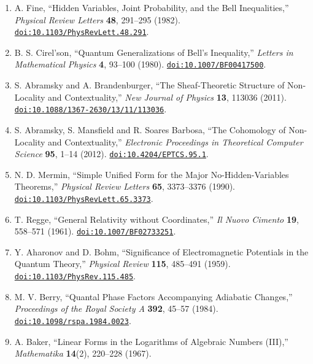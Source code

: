 \documentclass[
  11pt,
]{article}
\begin{document}
\begin{enumerate}
{  Review Letters} \textbf{23}, 880--884 (1969).
  \href{https://doi.org/10.1103/PhysRevLett.23.880}{\nolinkurl{doi:10.1103/PhysRevLett.23.880}}.
\item
  A. Fine, ``Hidden Variables, Joint Probability, and the Bell
  Inequalities,'' \emph{Physical Review Letters} \textbf{48}, 291--295
  (1982).
  \href{https://doi.org/10.1103/PhysRevLett.48.291}{\nolinkurl{doi:10.1103/PhysRevLett.48.291}}.
\item
  B. S. Cirel'son, ``Quantum Generalizations of Bell's Inequality,''
  \emph{Letters in Mathematical Physics} \textbf{4}, 93--100 (1980).
  \href{https://doi.org/10.1007/BF00417500}{\nolinkurl{doi:10.1007/BF00417500}}.
\item
  S. Abramsky and A. Brandenburger, ``The Sheaf-Theoretic Structure of
  Non-Locality and Contextuality,'' \emph{New Journal of Physics}
  \textbf{13}, 113036 (2011).
  \href{https://doi.org/10.1088/1367-2630/13/11/113036}{\nolinkurl{doi:10.1088/1367-2630/13/11/113036}}.
\item
  S. Abramsky, S. Mansfield and R. Soares Barbosa, ``The Cohomology of
  Non-Locality and Contextuality,'' \emph{Electronic Proceedings in
  Theoretical Computer Science} \textbf{95}, 1--14 (2012).
  \href{https://doi.org/10.4204/EPTCS.95.1}{\nolinkurl{doi:10.4204/EPTCS.95.1}}.
\item
  N. D. Mermin, ``Simple Unified Form for the Major No-Hidden-Variables
  Theorems,'' \emph{Physical Review Letters} \textbf{65}, 3373--3376
  (1990).
  \href{https://doi.org/10.1103/PhysRevLett.65.3373}{\nolinkurl{doi:10.1103/PhysRevLett.65.3373}}.
\item
  T. Regge, ``General Relativity without Coordinates,'' \emph{Il Nuovo
  Cimento} \textbf{19}, 558--571 (1961).
  \href{https://doi.org/10.1007/BF02733251}{\nolinkurl{doi:10.1007/BF02733251}}.
\item
  Y. Aharonov and D. Bohm, ``Significance of Electromagnetic Potentials
  in the Quantum Theory,'' \emph{Physical Review} \textbf{115}, 485--491
  (1959).
  \href{https://doi.org/10.1103/PhysRev.115.485}{\nolinkurl{doi:10.1103/PhysRev.115.485}}.
\item
  M. V. Berry, ``Quantal Phase Factors Accompanying Adiabatic Changes,''
  \emph{Proceedings of the Royal Society A} \textbf{392}, 45--57 (1984).
  \href{https://doi.org/10.1098/rspa.1984.0023}{\nolinkurl{doi:10.1098/rspa.1984.0023}}.
\item
  A. Baker, ``Linear Forms in the Logarithms of Algebraic Numbers
  (III),'' \emph{Mathematika} \textbf{14}(2), 220--228 (1967).

\end{enumerate}
\end{document}
